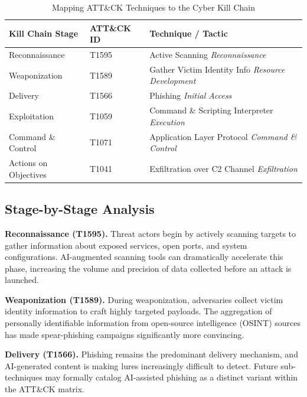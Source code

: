 \documentclass[sigconf,nonacm]{acmart}
\begin{document}
\begin{table}[h]
\centering
\caption{Mapping ATT\&CK Techniques to the Cyber Kill Chain}
\label{tab:mapping}
\small
\begin{tabularx}{\columnwidth}{@{}l l X@{}}
\toprule
\textbf{Kill Chain Stage} & \textbf{ATT\&CK ID} & \textbf{Technique / Tactic} \\
\midrule
Reconnaissance      & T1595 & Active Scanning \newline \textit{Reconnaissance} \\
\addlinespace[3pt]
Weaponization       & T1589 & Gather Victim Identity Info \newline \textit{Resource Development} \\
\addlinespace[3pt]
Delivery            & T1566 & Phishing \newline \textit{Initial Access} \\
\addlinespace[3pt]
Exploitation        & T1059 & Command \& Scripting Interpreter \newline \textit{Execution} \\
\addlinespace[3pt]
Command \& Control  & T1071 & Application Layer Protocol \newline \textit{Command \& Control} \\
\addlinespace[3pt]
Actions on Objectives & T1041 & Exfiltration over C2 Channel \newline \textit{Exfiltration} \\
\bottomrule
\end{tabularx}
\end{table}

\subsection{Stage-by-Stage Analysis}

\textbf{Reconnaissance (T1595).}
Threat actors begin by actively scanning targets to gather information about exposed
services, open ports, and system configurations. AI-augmented scanning tools can
dramatically accelerate this phase, increasing the volume and precision of data collected
before an attack is launched.

\textbf{Weaponization (T1589).}
During weaponization, adversaries collect victim identity information to craft
highly targeted payloads. The aggregation of personally identifiable information
from open-source intelligence (OSINT) sources has made spear-phishing campaigns
significantly more convincing.

\textbf{Delivery (T1566).}
Phishing remains the predominant delivery mechanism, and AI-generated content
is making lures increasingly difficult to detect. Future sub-techniques may formally
catalog AI-assisted phishing as a distinct variant within the ATT\&CK matrix.
\end{document}
